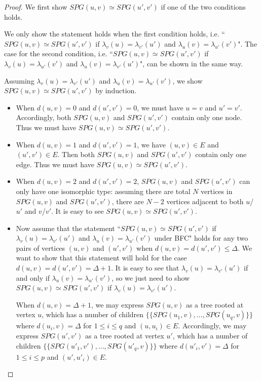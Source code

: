 \begin{proof}
We first show $SPG(u,v)\simeq SPG(u',v')$ if one of the two conditions holds.

We only show the statement holds when the first condition holds, i.e. ``$SPG(u,v)\simeq SPG(u',v')$ if $\lambda_v(u) = \lambda_{v'}(u')$ and $\lambda_u(v) = \lambda_{u'}(v')$". The case for the second condition, i.e. ``$SPG(u,v)\simeq SPG(u',v')$ if $\lambda_v(u) = \lambda_{u'}(v')$ and $\lambda_u(v) = \lambda_{v'}(u')$", can be shown in the same way.

Assuming $\lambda_v(u) = \lambda_{v'}(u')$ and $\lambda_u(v) = \lambda_{u'}(v')$, we show $SPG(u,v)\simeq SPG(u',v')$  by induction.
\begin{itemize}
    \item When $d(u,v)=0$ and $d(u',v')=0$, we must have $u=v$ and $u'=v'$. Accordingly, both $SPG(u,v)$ and $SPG(u',v')$ contain only one node. Thus we must have $SPG(u,v)\simeq SPG(u',v')$.
    \item When $d(u,v)=1$ and $d(u',v')=1$, we have $(u,v)\in E$ and $(u',v')\in E$. Then both $SPG(u,v)$ and $SPG(u',v')$ contain only one edge. Thus we must have $SPG(u,v)\simeq SPG(u',v')$.
    \item When $d(u,v)=2$ and $d(u',v')=2$, $SPG(u,v)$ and $SPG(u',v')$ can only have one isomorphic type: assuming there are total $N$ vertices in $SPG(u,v)$ and $SPG(u',v')$, there are $N-2$ vertices adjacent to both $u$/$u'$ and $v$/$v'$. It is easy to see $SPG(u,v)\simeq SPG(u',v')$.
    
    \item Now assume that the statement ``$SPG(u,v)\simeq SPG(u',v')$ if $\lambda_v(u)= \lambda_{v'}(u')$ and $\lambda_u(v)= \lambda_{u'}(v')$ under BFC" holds for any two pairs of vertices $(u,v)$ and $(u',v')$ when $d(u,v)=d(u',v')\leq \Delta$. We want to show that this statement will hold for the case $d(u,v)=d(u',v')= \Delta+1$. It is easy to see that $\lambda_v(u)= \lambda_{v'}(u')$ if and only if $\lambda_u(v)= \lambda_{u'}(v')$, so we just need to show $SPG(u,v)\simeq SPG(u',v')$ if $\lambda_v(u) = \lambda_{v'}(u')$.
    
    When $d(u,v)=\Delta+1$, we may express $SPG(u,v)$ as a tree rooted at vertex $u$, which has a number of children $\{\!\!\{SPG(u_1,v),\dots, SPG(u_q,v)\}\!\!\}$ where $d(u_i,v)=\Delta$ for $1\leq i\leq q$ and $(u,u_i)\in E$. Accordingly, we may express $SPG(u',v')$ as a tree rooted at vertex $u'$, which has a number of children $\{\!\!\{SPG(u'_1,v'),\dots, SPG(u'_q,v)\}\!\!\}$ where $d(u'_i,v')=\Delta$ for $1\leq i\leq p$ and $(u',u'_i)\in E$.
    

\end{itemize}
\end{proof}
